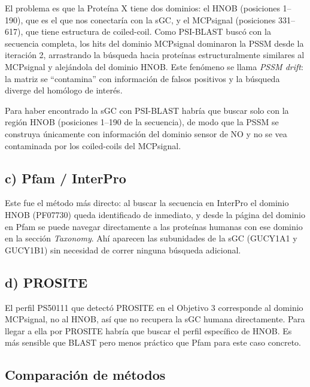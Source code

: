 El problema es que la Proteína X tiene dos dominios: el HNOB (posiciones 1--190), que es el
que nos conectaría con la sGC, y el MCPsignal (posiciones 331--617), que tiene estructura de
coiled-coil. Como PSI-BLAST buscó con la secuencia completa, los hits del dominio MCPsignal
dominaron la PSSM desde la iteración 2, arrastrando la búsqueda hacia proteínas estructuralmente
similares al MCPsignal y alejándola del dominio HNOB. Este fenómeno se llama \textit{PSSM drift}:
la matriz se ``contamina'' con información de falsos positivos y la búsqueda diverge del
homólogo de interés.

Para haber encontrado la sGC con PSI-BLAST habría que buscar solo con la región HNOB (posiciones
1--190 de la secuencia), de modo que la PSSM se construya únicamente con información del dominio
sensor de NO y no se vea contaminada por los coiled-coils del MCPsignal.

\subsection{c) Pfam / InterPro}

Este fue el método más directo: al buscar la secuencia en InterPro el dominio HNOB
(PF07730) queda identificado de inmediato, y desde la página del dominio en Pfam se puede
navegar directamente a las proteínas humanas con ese dominio en la sección \textit{Taxonomy}.
Ahí aparecen las subunidades de la sGC (GUCY1A1 y GUCY1B1) sin necesidad de correr ninguna
búsqueda adicional.

\subsection{d) PROSITE}

El perfil PS50111 que detectó PROSITE en el Objetivo 3 corresponde al dominio MCPsignal,
no al HNOB, así que no recupera la sGC humana directamente. Para llegar a ella por PROSITE
habría que buscar el perfil específico de HNOB. Es más sensible que BLAST pero menos práctico
que Pfam para este caso concreto.

\subsection{Comparación de métodos}

